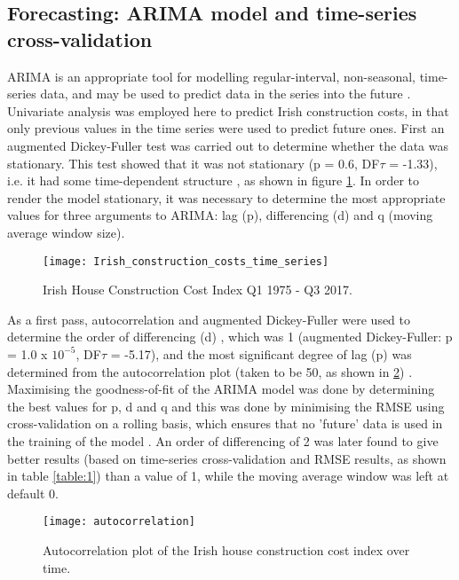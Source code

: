 \documentclass[hidelinks,12pt,oneside]{report} %
\begin{document}
\subsection{Forecasting: ARIMA model and time-series cross-validation}
ARIMA is an appropriate tool for modelling regular-interval, non-seasonal, time-series data, and may be used to predict data in the series into the future \citep{MSc}. Univariate analysis was employed here to predict Irish construction costs, in that only previous values in the time series were used to predict future ones. First an augmented Dickey-Fuller test was carried out to determine whether the data was stationary. This test showed that it was not stationary (p = 0.6, DF$\tau$ = -1.33), i.e. it had some time-dependent structure \citep{DF}, as shown in figure \ref{fig:Irish_construction_costs_time_series}. In order to render the model stationary, it was necessary to determine the most appropriate values for three arguments to ARIMA: lag (p), differencing (d) and q (moving average window size).

\begin{figure}[!ht]
	\centering
	\vspace{.4218cm}
		\texttt{[image: Irish\_construction\_costs\_time\_series]}	\captionsetup{justification=justified,width=1\linewidth}
	\caption{Irish House Construction Cost Index Q1 1975 - Q3 2017.}
\label{fig:Irish_construction_costs_time_series}
\end{figure}

As a first pass, autocorrelation and augmented Dickey-Fuller were used to determine the order of differencing (d) \citep{Raval}, which was 1 (augmented Dickey-Fuller: p = 1.0 x $10^{-5}$, DF$\tau$ = -5.17), and the most significant degree of lag (p) was determined from the autocorrelation plot (taken to be 50, as shown in \ref{fig:autocorrelation}) \citep{Raval, Nadeem}. Maximising the goodness-of-fit of the ARIMA model was done by determining the best values for p, d and q and this was done by minimising the RMSE \citep{Raval, SaS} using cross-validation on a rolling basis, which ensures that no 'future' data is used in the training of the model \citep{SS, Hyn}. An order of differencing of 2 was later found to give better results (based on time-series cross-validation and RMSE results, as shown in table \ref{table:1}) than a value of 1, while the moving average window was left at default 0.

\begin{figure}[!ht]
	\centering
	\vspace{.4218cm}
		\texttt{[image: autocorrelation]}	\captionsetup{justification=justified,width=1\linewidth}
	\caption{Autocorrelation plot of the Irish house construction cost index over time.}
\label{fig:autocorrelation}
\end{figure}
\end{document}
